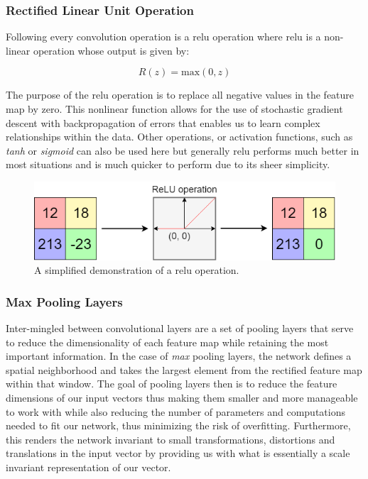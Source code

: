 \subsubsection{Rectified Linear Unit Operation}
\label{subsubsec:Background-Information:Convolutional-Neural-Networks:ReLU}
Following every convolution operation is a \gls{relu} operation where \gls{relu} is a non-linear operation whose output is given by:

\begin{equation}
    R(z) = \text{max}(0, z)
\label{eq:ReLU}
\end{equation}

\noindent \newline The purpose of the \gls{relu} operation is to replace all negative values in the feature map by zero. This nonlinear function allows for the use of stochastic gradient descent with backpropagation of errors that enables us to learn complex relationships within the data.  Other operations, or activation functions, such as \textit{tanh} or \textit{sigmoid} can also be used here but generally \gls{relu} performs much better in most situations and is much quicker to perform due to its sheer simplicity.

\begin{figure}[hbt!]
    \centering
    \includegraphics[width=\textwidth]{Images/Chapter 3/CNN/ReLU-Illustration.png}
    \caption{A simplified demonstration of a \gls{relu} operation.}
    \label{fig:ReLU-Illustration}
\end{figure}

\subsubsection{Max Pooling Layers}
\label{subsubsec:Background-Information:Convolutional-Neural-Networks:Max-Pooling-Layers}
Inter-mingled between convolutional layers are a set of pooling layers that serve to reduce the dimensionality of each feature map while retaining the most important information. In the case of \textit{max} pooling layers, the network defines a spatial neighborhood and takes the largest element from the rectified feature map within that window. The goal of pooling layers then is to reduce the feature dimensions of our input vectors thus making them smaller and more manageable to work with while also reducing the number of parameters and computations needed to fit our network, thus minimizing the risk of overfitting. Furthermore, this renders the network invariant to small transformations, distortions and translations in the input vector by providing us with what is essentially a scale invariant representation of our vector.

